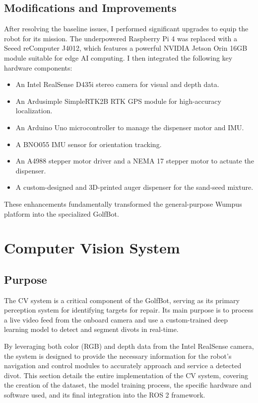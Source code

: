 \subsection{Modifications and Improvements} After resolving the baseline issues, I performed significant upgrades to equip the robot for its mission. The underpowered Raspberry Pi 4 was replaced with a Seeed reComputer J4012, which features a powerful NVIDIA Jetson Orin 16GB module suitable for edge AI computing. I then integrated the following key hardware components:
\begin{itemize}
    \item An Intel RealSense D435i stereo camera for visual and depth data.
    \item An Ardusimple SimpleRTK2B RTK GPS module for high-accuracy localization.
    \item An Arduino Uno microcontroller to manage the dispenser motor and IMU.
    \item A BNO055 IMU sensor for orientation tracking.
    \item An A4988 stepper motor driver and a NEMA 17 stepper motor to actuate the dispenser.
    \item A custom-designed and 3D-printed auger dispenser for the sand-seed mixture.
\end{itemize}
These enhancements fundamentally transformed the general-purpose Wumpus platform into the specialized GolfBot.

\section{Computer Vision System}
\subsection{Purpose}
\label{ssec:cv_intro}
The \gls{CV} system is a critical component of the GolfBot, serving as its primary perception system for identifying targets for repair. Its main purpose is to process a live video feed from the onboard camera and use a custom-trained deep learning model to detect and segment divots in real-time.

By leveraging both color (\gls{RGB}) and depth data from the Intel RealSense camera, the system is designed to provide the necessary information for the robot's navigation and control modules to accurately approach and service a detected divot. This section details the entire implementation of the CV system, covering the creation of the dataset, the model training process, the specific hardware and software used, and its final integration into the ROS 2 framework.

